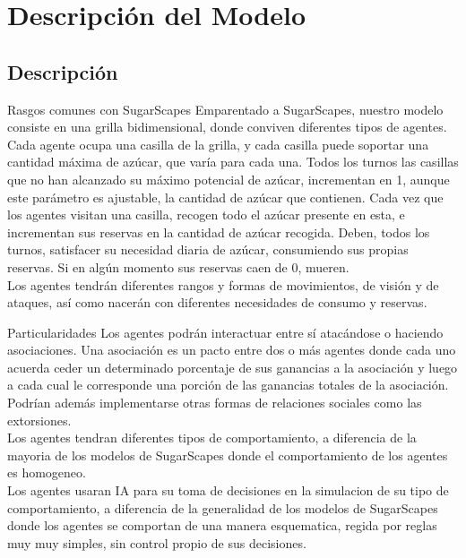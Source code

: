 \documentclass{beamer}
\begin{document}
\section{Descripción del Modelo}
\subsection{Descripción}
\begin{frame}{Rasgos comunes con SugarScapes}
  Emparentado a SugarScapes, nuestro modelo consiste en una grilla bidimensional, donde conviven diferentes tipos de agentes. Cada agente ocupa una casilla de la grilla, y cada casilla puede soportar una cantidad máxima de azúcar, que varía para cada una. Todos los turnos las casillas que no han alcanzado su máximo potencial de azúcar, incrementan en 1, aunque este parámetro es ajustable, la cantidad de azúcar que contienen. Cada vez que los agentes visitan una casilla, recogen todo el azúcar presente en esta, e incrementan sus reservas en la cantidad de azúcar recogida. Deben, todos los turnos, satisfacer su necesidad diaria de azúcar, consumiendo sus propias reservas. Si en algún momento sus reservas caen de 0, mueren.\\
  Los agentes tendrán diferentes rangos y formas de movimientos, de visión y de ataques, así como nacerán con diferentes necesidades de consumo y reservas.
\end{frame}

\begin{frame}{Particularidades}
  Los agentes podrán interactuar entre sí atacándose o haciendo asociaciones. Una asociación es un pacto entre dos o más agentes donde cada uno acuerda ceder un determinado porcentaje de sus ganancias a la asociación y luego a cada cual le corresponde una porción de las ganancias totales de la asociación. Podrían además implementarse otras formas de relaciones sociales como las extorsiones.\\
  Los agentes tendran diferentes tipos de comportamiento, a diferencia de la mayoria de los modelos de SugarScapes donde el comportamiento de los agentes es homogeneo.\\
  Los agentes usaran IA para su toma de decisiones en la simulacion de su tipo de comportamiento, a diferencia de la generalidad de los modelos de SugarScapes donde los agentes se comportan de una manera esquematica, regida por reglas muy muy simples, sin control propio de sus decisiones.\\
\end{frame}
\end{document}
